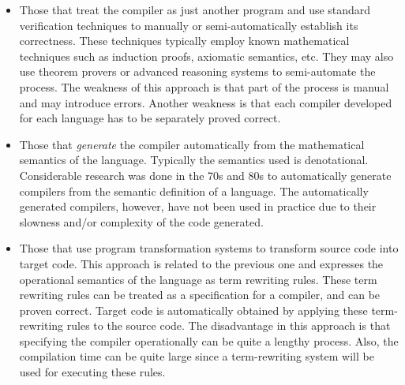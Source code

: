 \documentclass{entcs}
\begin{document}
\begin{itemize}
\item Those that treat the compiler as just another program and
use standard verification techniques to manually or semi-automatically
establish its correctness. These techniques typically 
employ known mathematical techniques such
as induction proofs, axiomatic semantics, etc. They may
also use theorem provers or advanced reasoning systems
to semi-automate the process. The weakness of this approach 
is that part of the process is manual and may introduce errors.
Another weakness is that each compiler developed
for each language has to be separately proved correct.
\item Those that {\it generate} the compiler automatically from the
      mathematical semantics of the language. Typically
      the semantics used is denotational. Considerable
      research was done in the 70s and 80s to automatically
      generate compilers from the semantic definition of
      a language.  The automatically generated compilers,
      however, have not been used in practice due to their
      slowness and/or complexity of the code generated.

\item Those that use program transformation systems to
transform source code into target code. This approach is
related to the previous one and expresses the operational
semantics of the language as term rewriting rules. These
term rewriting rules can be treated as a specification for
a compiler, and can be proven correct. Target
code is automatically obtained by applying these term-rewriting rules 
to the source code. The disadvantage in this approach
is that specifying the compiler operationally can be
quite a lengthy process. Also, the compilation time can
be quite large since a term-rewriting system will be used
for executing these rules.
\end{itemize}
      
\noindent 
\end{document}
